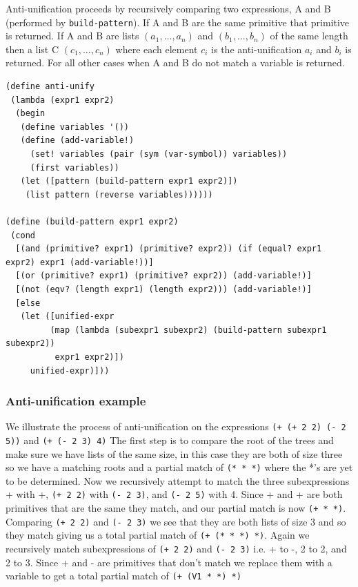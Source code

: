 \documentclass[a4paper,10pt]{article}
\begin{document}
Anti-unification proceeds by recursively comparing two expressions, A and B (performed by \texttt{build-pattern}).  If A and B are the same primitive that primitive is returned.  If A and B are lists $(a_1,\ldots,a_n)$ and $(b_1,\ldots,b_n)$ of the same length then a list C $(c_1,\ldots,c_n)$ where each element $c_i$ is the anti-unification $a_i$ and $b_i$ is returned.  For all other cases when A and B do not match a variable is returned.

\begin{verbatim}
(define anti-unify
 (lambda (expr1 expr2)
  (begin
   (define variables '())
   (define (add-variable!)
     (set! variables (pair (sym (var-symbol)) variables))
     (first variables))
   (let ([pattern (build-pattern expr1 expr2)])
    (list pattern (reverse variables))))))

(define (build-pattern expr1 expr2)
 (cond 
  [(and (primitive? expr1) (primitive? expr2)) (if (equal? expr1 expr2) expr1 (add-variable!))]
  [(or (primitive? expr1) (primitive? expr2)) (add-variable!)]
  [(not (eqv? (length expr1) (length expr2))) (add-variable!)]
  [else
   (let ([unified-expr 
         (map (lambda (subexpr1 subexpr2) (build-pattern subexpr1 subexpr2))
          expr1 expr2)])
     unified-expr)]))
\end{verbatim}

\subsubsection{Anti-unification example}
We illustrate the process of anti-unification on the expressions \texttt{(+ (+ 2 2) (- 2 5))} and \texttt{(+ (- 2 3) 4)}
The first step is to compare the root of the trees and make sure we have lists of the same size, in this case they are both of size three so we have a matching roots and a partial match of \texttt{(* * *)} where the *'s are yet to be determined.
Now we recursively attempt to match the three subexpressions + with +, \texttt{(+ 2 2)} with \texttt{(- 2 3)}, and \texttt{(- 2 5)} with 4.
Since + and + are both primitives that are the same they match, and our partial match is now \texttt{(+ * *)}.
Comparing \texttt{(+ 2 2)} and \texttt{(- 2 3)} we see that they are both lists of size 3 and so they match giving us a total partial match of \texttt{(+ (* * *) *)}.
Again we recursively match subexpressions of \texttt{(+ 2 2)} and \texttt{(- 2 3)} i.e. + to -, 2 to 2, and 2 to 3.
Since + and - are primitives that don't match we replace them with a variable to get a total partial match of \texttt{(+ (V1 * *) *)}
\end{document}

